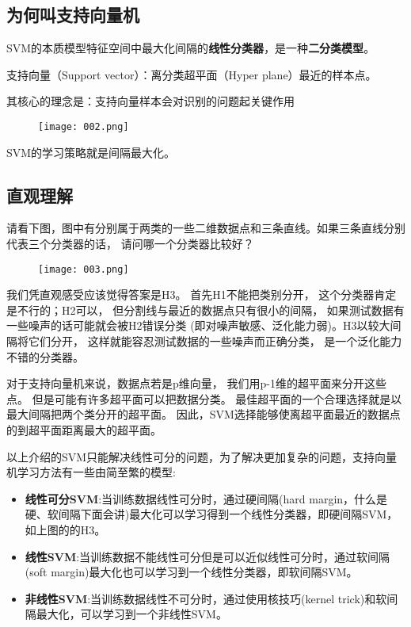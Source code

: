 \documentclass[12pt]{article}
\begin{document}
\subsection{为何叫支持向量机}
SVM的本质模型特征空间中最大化间隔的\textbf{线性分类器}，是一种\textbf{二分类模型}。

支持向量（Support vector）：离分类超平面（Hyper plane）最近的样本点。

其核心的理念是：支持向量样本会对识别的问题起关键作用
\begin{figure}[htbp]
	\centering
	\texttt{[image: 002.png]}
\end{figure}

SVM的学习策略就是间隔最大化。

\subsection{直观理解}
请看下图，图中有分别属于两类的一些二维数据点和三条直线。如果三条直线分别代表三个分类器的话，
请问哪一个分类器比较好？
\begin{figure}[htbp]
	\centering
	\texttt{[image: 003.png]}
\end{figure}

我们凭直观感受应该觉得答案是H3。
首先H1不能把类别分开，
这个分类器肯定是不行的；H2可以，
但分割线与最近的数据点只有很小的间隔，
如果测试数据有一些噪声的话可能就会被H2错误分类
(即对噪声敏感、泛化能力弱)。H3以较大间隔将它们分开，
这样就能容忍测试数据的一些噪声而正确分类，
是一个泛化能力不错的分类器。

对于支持向量机来说，数据点若是p维向量，
我们用p-1维的超平面来分开这些点。
但是可能有许多超平面可以把数据分类。
最佳超平面的一个合理选择就是以最大间隔把两个类分开的超平面。
因此，SVM选择能够使离超平面最近的数据点的到超平面距离最大的超平面。

以上介绍的SVM只能解决线性可分的问题，为了解决更加复杂的问题，支持向量机学习方法有一些由简至繁的模型:
\begin{itemize}
	\item \textbf{线性可分SVM}:当训练数据线性可分时，通过硬间隔(hard margin，什么是硬、软间隔下面会讲)最大化可以学习得到一个线性分类器，即硬间隔SVM，如上图的的H3。
	\item \textbf{线性SVM}:当训练数据不能线性可分但是可以近似线性可分时，通过软间隔(soft margin)最大化也可以学习到一个线性分类器，即软间隔SVM。
	\item \textbf{非线性SVM}:当训练数据线性不可分时，通过使用核技巧(kernel trick)和软间隔最大化，可以学习到一个非线性SVM。
\end{itemize}
\end{document}

